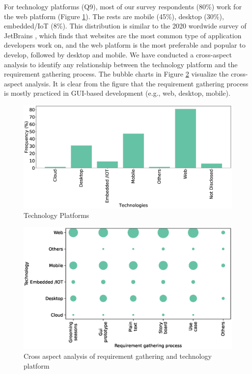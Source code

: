 For technology platforms (Q9), most of our survey respondents (80\%) work for the web
platform (Figure \ref{fig:platforms}). The rests are mobile (45\%), desktop (30\%), embedded/IoT
(8\%). This distribution is similar to the 2020 wordwide survey of JetBrains \citep{JetBrains2020}, which finds that 
websites are the
most common type of application developers work on, and the web platform is the
most preferable and popular to develop, followed by desktop and mobile. We have conducted a cross-aspect analysis to identify any relationship
between the technology platform and the requirement gathering process. The
bubble charts in Figure \ref{fig:requirement technology cross analysis}
visualize the cross-aspect analysis. It is clear from the figure that the
requirement gathering process is mostly practiced in GUI-based development
(e.g., web, desktop, mobile).
\begin{figure}[t]
\centering
  \includegraphics[scale=0.18]{Figures/Respondents_Technologies}
  \caption{Technology Platforms}
  \label{fig:platforms}
\end{figure}
\begin{figure}[t]
\centering
  \includegraphics[scale=0.47]{Figures/Requirement_Technology_Cross_Analysis.eps}
  \caption{Cross aspect analysis of requirement gathering and technology platform}
  \label{fig:requirement technology cross analysis}
\end{figure}

